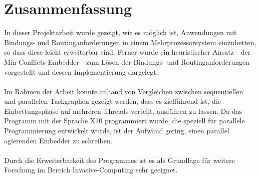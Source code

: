 \chapter{Zusammenfassung}\label{zusammenfassung}

In dieser Projektarbeit wurde gezeigt, wie es möglich ist, Anwendungen mit Bindungs- und Routinganforderungen in einem Mehrprozessorsystem einzubetten, so dass diese leicht erweiterbar sind. Ferner wurde ein heuristischer  Ansatz - der Min-Conflicts-Embedder - zum Lösen der Bindungs- und Routinganforderungen vorgestellt und dessen Implementierung dargelegt.\\
\\
Im Rahmen der Arbeit konnte anhand von Vergleichen zwischen sequentiellen und parallelen Taskgraphen gezeigt werden, dass es zielführend ist, die Einbettungsphase auf mehreren Threads verteilt, ausführen zu lassen. Da das Programm mit der Sprache X10 programmiert wurde, die speziell für parallele Programmierung entwickelt wurde, ist der Aufwand gering, einen parallel agierenden Embedder zu schreiben.\\
\\
Durch die Erweiterbarkeit des Programmes ist es als Grundlage für weitere Forschung im Bereich Invasive-Computing \cite{invasiveComputing} sehr geeignet.

